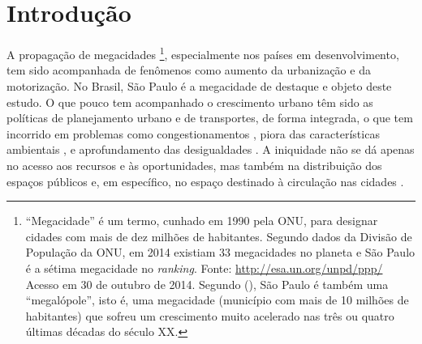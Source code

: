 \chapter{Introdução}

A propagação de megacidades%
\footnote{``Megacidade'' é um termo, cunhado em 1990 pela ONU, para designar cidades com mais de dez milhões de habitantes. Segundo dados da Divisão de População da ONU, em 2014 existiam 33 megacidades no planeta e São Paulo é a sétima megacidade no \emph{ranking}. Fonte: \url{http://esa.un.org/unpd/ppp/} Acesso em 30 de outubro de 2014.
Segundo  (\citeyear{FREITAG2007}), São Paulo é também uma ``megalópole'', isto é, uma megacidade (município com mais de 10 milhões de habitantes) que sofreu um crescimento muito acelerado nas três ou quatro últimas décadas do século XX.},
%
especialmente nos países em desenvolvimento, tem sido acompanhada de fenômenos como aumento da urbanização e da motorização. No Brasil, São Paulo é a megacidade de destaque e objeto deste estudo.
O que pouco tem acompanhado o crescimento urbano têm sido as políticas de planejamento urbano e de transportes, de forma integrada, o que tem incorrido em problemas como congestionamentos \cite{KINGHAM2001,STENG2005,METZ2012}, piora das características ambientais \cite{TERTOOLEN1998,RICHARDSON2005,BANISTER2011}, e aprofundamento das desigualdades \cite{HODGE1995,AHMED2008,LEWIS2011}.
A iniquidade não se dá apenas no acesso aos recursos e às oportunidades, mas também na distribuição dos espaços públicos \cite{ALVA1997} e, em específico, no espaço destinado à circulação nas cidades \cite{VASCONCELLOS2012}.


